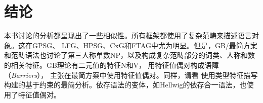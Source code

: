 \chapter{结论}

本书讨论的分析都呈现出了一些相似性。所有框架都使用了复杂范畴来描述语言对象。这在GPSG\indexgpsgc、
LFG\indexlfgc、HPSG\indexhpsgc、CxG\indexcxgc 和FTAG\indextagc 中尤为明显。但是，GB/最简方案和范畴语法也讨论了第三人称单数NP，以及构成复杂范畴部分的词类、人称和数的相关特征。GB理论有二元值的特征N和V\citep[]{Chomsky70a}， \citet[]{Stabler92a-u}用特征值偶对构成语障（\emph{Barriers}）， \citet[--291]{SE2002a}主张在最简方案\indexmpc 中使用特征值偶对。同样，请看 \citet{Veenstra98a}使用类型特征描写构建的基于约束的最简分析。依存语法的变体，如Hellwig的依存合一语法，也使用了特征值偶对\citep[]{Hellwig2003a}。

